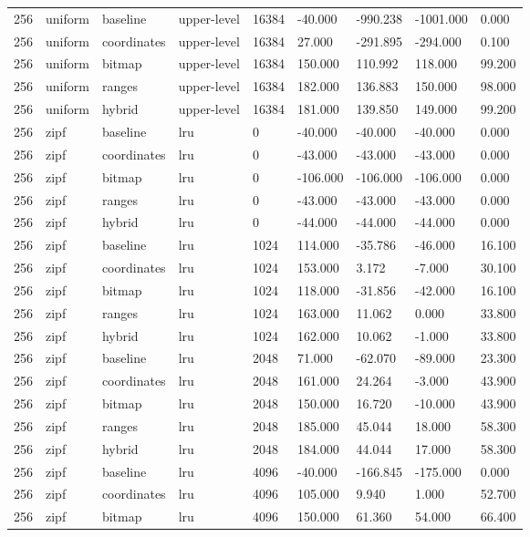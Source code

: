 \begin{tabular}{lllllllll}
256 & uniform & baseline & upper-level & 16384 & -40.000 & -990.238 & -1001.000 & 0.000 \\
256 & uniform & coordinates & upper-level & 16384 & 27.000 & -291.895 & -294.000 & 0.100 \\
256 & uniform & bitmap & upper-level & 16384 & 150.000 & 110.992 & 118.000 & 99.200 \\
256 & uniform & ranges & upper-level & 16384 & 182.000 & 136.883 & 150.000 & 98.000 \\
256 & uniform & hybrid & upper-level & 16384 & 181.000 & 139.850 & 149.000 & 99.200 \\
256 & zipf & baseline & lru & 0 & -40.000 & -40.000 & -40.000 & 0.000 \\
256 & zipf & coordinates & lru & 0 & -43.000 & -43.000 & -43.000 & 0.000 \\
256 & zipf & bitmap & lru & 0 & -106.000 & -106.000 & -106.000 & 0.000 \\
256 & zipf & ranges & lru & 0 & -43.000 & -43.000 & -43.000 & 0.000 \\
256 & zipf & hybrid & lru & 0 & -44.000 & -44.000 & -44.000 & 0.000 \\
256 & zipf & baseline & lru & 1024 & 114.000 & -35.786 & -46.000 & 16.100 \\
256 & zipf & coordinates & lru & 1024 & 153.000 & 3.172 & -7.000 & 30.100 \\
256 & zipf & bitmap & lru & 1024 & 118.000 & -31.856 & -42.000 & 16.100 \\
256 & zipf & ranges & lru & 1024 & 163.000 & 11.062 & 0.000 & 33.800 \\
256 & zipf & hybrid & lru & 1024 & 162.000 & 10.062 & -1.000 & 33.800 \\
256 & zipf & baseline & lru & 2048 & 71.000 & -62.070 & -89.000 & 23.300 \\
256 & zipf & coordinates & lru & 2048 & 161.000 & 24.264 & -3.000 & 43.900 \\
256 & zipf & bitmap & lru & 2048 & 150.000 & 16.720 & -10.000 & 43.900 \\
256 & zipf & ranges & lru & 2048 & 185.000 & 45.044 & 18.000 & 58.300 \\
256 & zipf & hybrid & lru & 2048 & 184.000 & 44.044 & 17.000 & 58.300 \\
256 & zipf & baseline & lru & 4096 & -40.000 & -166.845 & -175.000 & 0.000 \\
256 & zipf & coordinates & lru & 4096 & 105.000 & 9.940 & 1.000 & 52.700 \\
256 & zipf & bitmap & lru & 4096 & 150.000 & 61.360 & 54.000 & 66.400 \\

\end{tabular}
